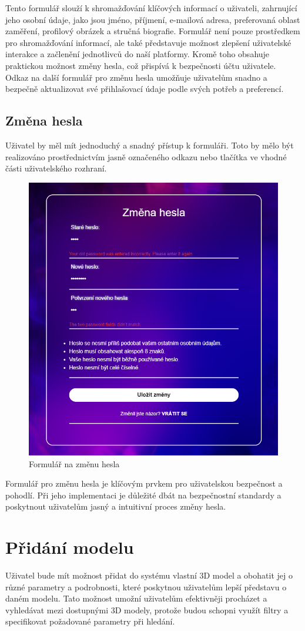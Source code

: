\documentclass[12pt, a4paper,
oneside,      %
openright
]{report}
\begin{document}
Tento formulář slouží k shromažďování klíčových informací o uživateli, zahrnující jeho osobní údaje, jako jsou jméno, příjmení, e-mailová adresa, preferovaná oblast zaměření, profilový obrázek a stručná biografie. Formulář není pouze prostředkem pro shromažďování informací, ale také představuje možnost zlepšení uživatelské interakce a začlenění jednotlivců do naší platformy. Kromě toho obsahuje praktickou možnost změny hesla, což přispívá k bezpečnosti účtu uživatele. Odkaz na další formulář pro změnu hesla umožňuje uživatelům snadno a bezpečně aktualizovat své přihlašovací údaje podle svých potřeb a preferencí.
\subsection[Změna hesla]{Změna hesla}
Uživatel by měl mít jednoduchý a snadný přístup k formuláři. Toto by mělo být realizováno prostřednictvím jasně označeného odkazu nebo tlačítka ve vhodné části uživatelského rozhraní.

\begin{figure}[h]
			\centering
			\includegraphics[width=0.5\linewidth]{image/change-password.png} 
			\caption{Formulář na změnu hesla}
		\end{figure}
		Formulář pro změnu hesla je klíčovým prvkem pro uživatelskou bezpečnost a pohodlí. Při jeho implementaci je důležité dbát na bezpečnostní standardy a poskytnout uživatelům jasný a intuitivní proces změny hesla.
		\newpage
	\section[Přidání modelu]{Přidání modelu}
	Uživatel bude mít možnost přidat do systému vlastní 3D model a obohatit jej o různé parametry a podrobnosti, které poskytnou uživatelům lepší představu o daném modelu. Tato možnost umožní uživatelům efektivněji procházet a vyhledávat mezi dostupnými 3D modely, protože budou schopni využít filtry a specifikovat požadované parametry při hledání.
	
\end{document}
